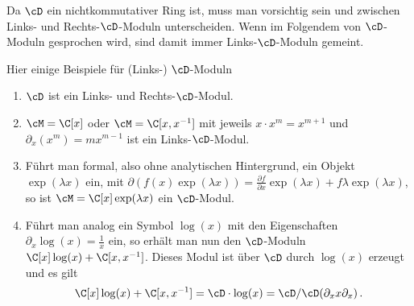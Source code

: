 Da $\cD$ ein nichtkommutativer Ring ist, muss man vorsichtig sein und zwischen
Links- und Rechts-$\cD$-Moduln unterscheiden.
Wenn im Folgendem von $\cD$-Moduln gesprochen wird, sind damit immer
Links-$\cD$-Moduln gemeint.

\begin{exmp}
Hier einige Beispiele für (Links-) $\cD$-Moduln
\begin{enumerate}
%
\item $\cD$ ist ein Links- und Rechts-$\cD$-Modul.
%
\item $\cM=\C[x]$ oder $\cM=\C[x,x^{-1}]$ mit jeweils $x\cdot x^{m}=x^{m+1}$
und $\partial_x(x^m)=mx^{m-1}$ ist ein Links-$\cD$-Modul.
%
\item Führt man formal, also ohne analytischen Hintergrund, ein Objekt
$\exp(\lambda x)$ ein, mit $\partial(f(x)\exp(\lambda x))=\frac{\partial
f}{\partial x}\exp(\lambda x)+f\lambda\exp(\lambda x)$, so ist
$\cM=\C[x]\exp(\lambda x)$ ein $\cD$-Modul.
%
\begin{comment}
\cite[Exmp 2.2]{ArkhipovDmod}
\end{comment}
\item Führt man analog ein Symbol $\log(x)$ mit den Eigenschaften
$\partial_x\log(x)=\frac{1}{x}$ ein, so erhält man nun den $\cD$-Moduln
$\C[x]\log(x)+\C[x,x^{-1}]$. Dieses Modul ist über $\cD$ durch $\log(x)$
erzeugt und es gilt
\[
\C[x]\log(x)+\C[x,x^{-1}]=\cD\cdot\log(x)=\cD\slash\cD(\partial_x x\partial_x) \,.
\]
\end{enumerate}
\end{exmp}

\begin{comment}
\begin{lem}\cite[Lem 2.3.3.]{sabbah_cimpa90}
Sei $\cM$ ein Links-$\cD$-Modul von endlichem Typ, welches auch von endlichem
Typ über $\Ckx$ ist. Dann ist $\cM$ bereits ein freies $\C\{x\}$-Modul.
\end{lem}
\begin{proof}
Siehe \cite[Lem 2.3.3.]{sabbah_cimpa90}.
\end{proof}
\begin{cor} \cite[Cor 2.3.4.]{sabbah_cimpa90}
Falls $\cM$ ein Links-$\cD$-Modul von endlichem Typ, welches außerdem ein
endlich dimensionaler Vektorraum ist, so ist schon $\cM=\{0\}$.
\end{cor}
\end{comment}

